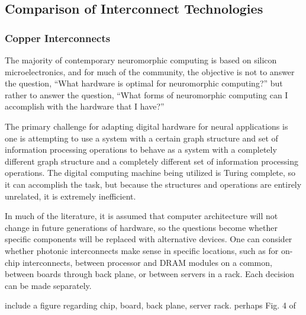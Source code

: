 \subsection{Comparison of Interconnect Technologies}

\subsubsection{Copper Interconnects}
The majority of contemporary neuromorphic computing is based on silicon microelectronics, and for much of the community, the objective is not to answer the question, ``What hardware is optimal for neuromorphic computing?'' but rather to answer the question, ``What forms of neuromorphic computing can I accomplish with the hardware that I have?'' 

\vspace{3em}
The primary challenge for adapting digital hardware for neural applications is one is attempting to use a system with a certain graph structure and set of information processing operations to behave as a system with a completely different graph structure and a completely different set of information processing operations. The digital computing machine being utilized is Turing complete, so it can accomplish the task, but because the structures and operations are entirely unrelated, it is extremely inefficient.

\vspace{3em}
In much of the literature, it is assumed that computer architecture will not change in future generations of hardware, so the questions become whether specific components will be replaced with alternative devices. One can consider whether photonic interconnects make sense in specific locations, such as for on-chip interconnects, between processor and DRAM modules on a common, between boards through back plane, or between servers in a rack. Each decision can be made separately. 

\vspace{3em}
include a figure regarding chip, board, back plane, server rack. perhaps Fig. 4 of \cite{husz2003}


